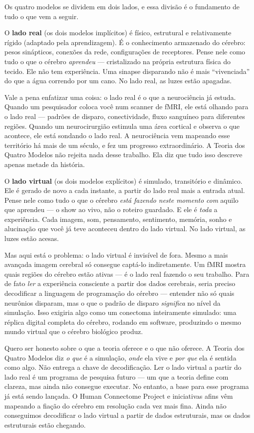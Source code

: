 \documentclass[11pt, twoside, openright]{book}
\begin{document}
Os quatro modelos se dividem em dois lados, e essa divisão é o fundamento de tudo o que vem a seguir.

O \textbf{lado real} (os dois modelos implícitos) é físico, estrutural e relativamente rígido (adaptado pela aprendizagem). É o conhecimento armazenado do cérebro: pesos sinápticos, conexões da rede, configurações de receptores. Pense nele como tudo o que o cérebro \textit{aprendeu} --- cristalizado na própria estrutura física do tecido. Ele não tem experiência. Uma sinapse disparando não é mais ``vivenciada'' do que a água correndo por um cano. No lado real, as luzes estão apagadas.

Vale a pena enfatizar uma coisa: o lado real é o que a neurociência já estuda. Quando um pesquisador coloca você num scanner de fMRI, ele está olhando para o lado real --- padrões de disparo, conectividade, fluxo sanguíneo para diferentes regiões. Quando um neurocirurgião estimula uma área cortical e observa o que acontece, ele está sondando o lado real. A neurociência vem mapeando esse território há mais de um século, e fez um progresso extraordinário. A Teoria dos Quatro Modelos não rejeita nada desse trabalho. Ela diz que tudo isso descreve apenas metade da história.

O \textbf{lado virtual} (os dois modelos explícitos) é simulado, transitório e dinâmico. Ele é gerado de novo a cada instante, a partir do lado real mais a entrada atual. Pense nele como tudo o que o cérebro \textit{está fazendo neste momento com} aquilo que aprendeu --- o show ao vivo, não o roteiro guardado. E ele é \textit{toda} a experiência. Cada imagem, som, pensamento, sentimento, memória, sonho e alucinação que você já teve aconteceu dentro do lado virtual. No lado virtual, as luzes estão acesas.

Mas aqui está o problema: o lado virtual é invisível de fora. Mesmo a mais avançada imagem cerebral só consegue captá-lo indiretamente. Um fMRI mostra quais regiões do cérebro estão ativas --- é o lado real fazendo o seu trabalho. Para de fato \textit{ler} a experiência consciente a partir dos dados cerebrais, seria preciso decodificar a linguagem de programação do cérebro --- entender não só quais neurônios disparam, mas o que o padrão de disparo \textit{significa} no nível da simulação. Isso exigiria algo como um conectoma inteiramente simulado: uma réplica digital completa do cérebro, rodando em software, produzindo o mesmo mundo virtual que o cérebro biológico produz.

Quero ser honesto sobre o que a teoria oferece e o que não oferece. A Teoria dos Quatro Modelos diz \textit{o que} é a simulação, \textit{onde} ela vive e \textit{por que} ela é sentida como algo. Não entrega a chave de decodificação. Ler o lado virtual a partir do lado real é um programa de pesquisa futuro --- um que a teoria define com clareza, mas ainda não consegue executar. No entanto, a base para esse programa já está sendo lançada. O Human Connectome Project e iniciativas afins vêm mapeando a fiação do cérebro em resolução cada vez mais fina. Ainda não conseguimos decodificar o lado virtual a partir de dados estruturais, mas os dados estruturais estão chegando.
\end{document}
